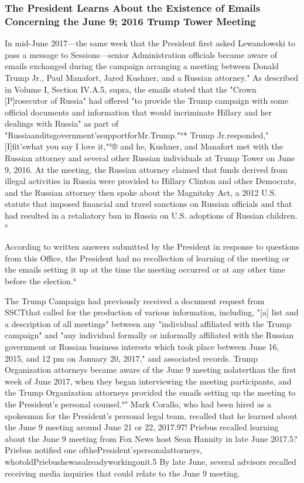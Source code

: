 \subsubsection{The President Learns About the Existence of Emails Concerning the June 9; 2016 Trump Tower Meeting}

In mid-June 2017—the same week that the President first asked Lewandowski to pass a message to Sessions—senior Administration officials became aware of emails exchanged during the campaign arranging a meeting between Donald Trump Jr., Paul Manafort, Jared Kushner, and a Russian attorney."
As described in Volume I, Section IV.A.5, supra, the emails stated that the "Crown [P]rosecutor of Russia" had offered "to provide the Trump campaign with some official documents and information that would incriminate Hillary and her dealings with Russia" as part of "Russiaanditsgovernment'ssupportforMr.Trump."°*
Trump Jr.responded,"[I]fit'swhat you say I love it,"°® and he, Kushner, and Manafort met with the Russian attorney and several other Russian individuals at Trump Tower on June 9, 2016.%
At the meeting, the Russian attorney claimed that funds derived from illegal activities in Russia were provided to Hillary Clinton and other Democrats, and the Russian attorney then spoke about the Magnitsky Act, a 2012 U.S. statute that imposed financial and travel sanctions on Russian officials and that had resulted in a retaliatory ban in Russia on U.S. adoptions of Russian children.°

According to written answers submitted by the President in response to questions from this Office, the President had no recollection of learning of the meeting or the emails setting it up at the time the meeting occurred or at any other time before the election.°

The Trump Campaign had previously received a document request from SSCTthat called for the production of various information, including, "[a] list and a description of all meetings" between any "individual affiliated with the Trump campaign" and "any individual formally or informally affiliated with the Russian government or Russian business interests which took place between June 16, 2015, and 12 pm on January 20, 2017," and associated records.%
Trump Organization attorneys became aware of the June 9 meeting nolaterthan the first week of June 2017, when they began interviewing the meeting participants, and the Trump Organization attorneys provided the emails setting up the meeting to the President's personal counsel.°"
Mark Corallo, who had been hired as a spokesman for the President's personal legal team, recalled that he learned about the June 9 meeting around June 21 or 22, 2017.97!
Priebus recalled learning about the June 9 meeting from Fox News host Sean Hannity in late June 2017.5?
Priebus notified one ofthePresident'spersonalattorneys, whotoldPriebushewasalreadyworkingonit.5
By late June, several advisors recalled receiving media inquiries that could relate to the June 9 meeting. %

